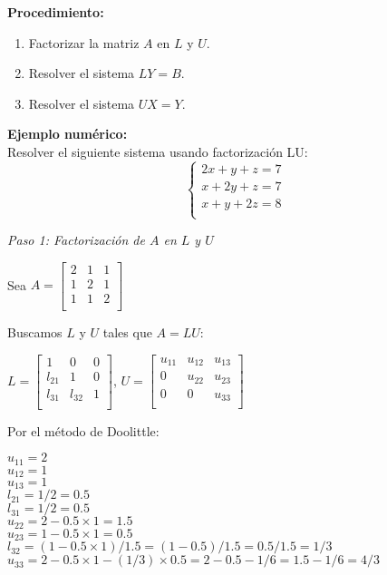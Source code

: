 \documentclass[12pt]{article}
\begin{document}
\textbf{Procedimiento:}
\begin{enumerate}
    \item Factorizar la matriz $A$ en $L$ y $U$.
    \item Resolver el sistema $LY = B$.
    \item Resolver el sistema $UX = Y$.
\end{enumerate}

\textbf{Ejemplo numérico:}  \\
Resolver el siguiente sistema usando factorización LU:
\[
\begin{cases}
2x + y + z = 7 \\
x + 2y + z = 7 \\
x + y + 2z = 8 \\
\end{cases}
\]

\textit{Paso 1: Factorización de $A$ en $L$ y $U$}

Sea $A = 
\begin{bmatrix}
2 & 1 & 1 \\
1 & 2 & 1 \\
1 & 1 & 2 \\
\end{bmatrix}$

Buscamos $L$ y $U$ tales que $A = LU$:

$L = 
\begin{bmatrix}
1 & 0 & 0 \\
l_{21} & 1 & 0 \\
l_{31} & l_{32} & 1 \\
\end{bmatrix}$,
$U = 
\begin{bmatrix}
u_{11} & u_{12} & u_{13} \\
0 & u_{22} & u_{23} \\
0 & 0 & u_{33} \\
\end{bmatrix}$

Por el método de Doolittle:

$u_{11} = 2$\\
$u_{12} = 1$\\
$u_{13} = 1$\\
$l_{21} = 1/2 = 0.5$\\
$l_{31} = 1/2 = 0.5$\\
$u_{22} = 2 - 0.5 \times 1 = 1.5$\\
$u_{23} = 1 - 0.5 \times 1 = 0.5$\\
$l_{32} = (1 - 0.5 \times 1)/1.5 = (1 - 0.5)/1.5 = 0.5/1.5 = 1/3$\\
$u_{33} = 2 - 0.5 \times 1 - (1/3) \times 0.5 = 2 - 0.5 - 1/6 = 1.5 - 1/6 = 4/3$
\end{document}
